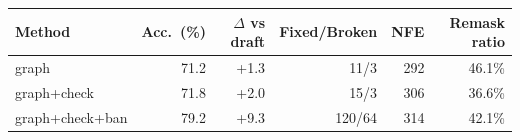 \begin{tabular}{lrrrrr}
\toprule
Method & Acc.\ (\%) & $\Delta$ vs draft & Fixed/Broken & NFE & Remask ratio \\
\midrule
graph & 71.2 & +1.3 & 11/3 & 292 & 46.1\% \\
graph+check & 71.8 & +2.0 & 15/3 & 306 & 36.6\% \\
graph+check+ban & 79.2 & +9.3 & 120/64 & 314 & 42.1\% \\
\bottomrule
\end{tabular}
